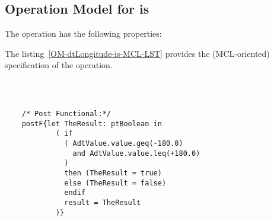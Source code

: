 \subsection{Operation Model for is}

\label{OM-is}


The  operation has the following properties:

	\begin{operationmodel}



		


	\end{operationmodel}



	\vspace{1cm}
	The listing~\ref{OM-dtLongitude-is-MCL-LST} provides the \msrmessir (MCL-oriented) specification of the operation.
	
	\scriptsize
	\vspace{0.5cm}
	\begin{lstlisting}[style=MessirStyle,firstnumber=auto,captionpos=b,caption={\msrmessir (MCL-oriented) specification of the operation \emph{is}.},label=OM-dtLongitude-is-MCL-LST]

	
	
	/* Post Functional:*/ 
	postF{let TheResult: ptBoolean in
	        ( if
	          ( AdtValue.value.geq(-180.0)
	            and AdtValue.value.leq(+180.0)
	          )
	          then (TheResult = true)
	          else (TheResult = false)
	          endif
	          result = TheResult
	        )}
	
	
	\end{lstlisting}
	\normalsize 
	
	
	
	





